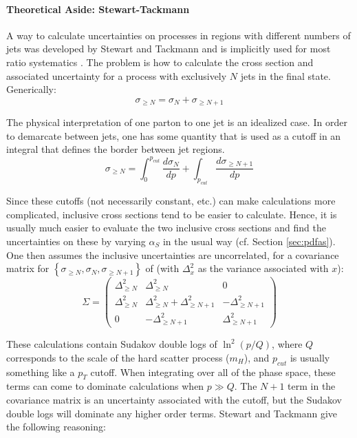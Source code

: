 \paragraph{Theoretical Aside: Stewart-Tackmann}
\label{sec:stewtack}
A way to calculate uncertainties on processes in regions with different numbers of jets was developed by Stewart and Tackmann and is implicitly used for most \nj\, ratio systematics \cite{stewarttackmann}.  The problem is how to calculate the cross section and associated uncertainty for a process with exclusively $N$ jets in the final state.  Generically:
\begin{equation}
\label{eqn:stewtack1}
\sigma_{\ge N}=\sigma_N+\sigma_{\ge N+1}
\end{equation}

The physical interpretation of one parton to one jet is an idealized case.  In order to demarcate between jets, one has some quantity that is used as a cutoff in an integral that defines the border between jet regions.  
\begin{equation}
\label{eqn:stewtack2}
\sigma_{\ge N}=\int_0^{p_{cut}}\frac{d\sigma_N}{dp}+\int_{p_{cut}}\frac{d\sigma_{\ge N+1}}{dp}
\end{equation}

Since these cutoffs (not necessarily constant, etc.) can make calculations more complicated, inclusive cross sections tend to be easier to calculate.  Hence, it is usually much easier to evaluate the two inclusive cross sections and find the uncertainties on these by varying $\alpha_S$ in the usual way (cf. Section \ref{sec:pdfas}).  One then assumes the inclusive uncertainties are uncorrelated, for a covariance matrix for $\left\{\sigma_{\ge N},\sigma_N,\sigma_{\ge N+1}\right\}$ of (with $\Delta_x^2$ as the variance associated with $x$):
\begin{equation}
\label{stewtackcov}
\Sigma=\left(\begin{array}{ccc} \Delta^2_{\ge N} & \Delta^2_{\ge N} &0\\ \Delta^2_{\ge N}& \Delta^2_{\ge N}+\Delta^2_{\ge N+1}& -\Delta^2_{\ge N+1}\\ 0& -\Delta^2_{\ge N+1} & \Delta^2_{\ge N+1} \end{array}\right)
\end{equation}

These calculations contain Sudakov double logs of $\ln^2\left(p/Q\right)$, where $Q$ corresponds to the scale of the hard scatter process ($m_H$), and $p_{cut}$ is usually something like a $p_T$ cutoff.  When integrating over all of the phase space, these terms can come to dominate calculations when $p\gg Q$.  The $N+1$ term in the covariance matrix is an uncertainty associated with the cutoff, but the Sudakov double logs will dominate any higher order terms.  Stewart and Tackmann give the following reasoning:


